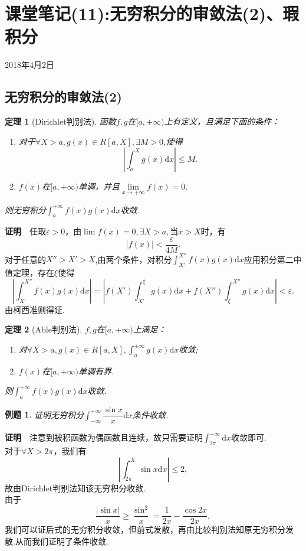 \documentclass[UTF8]{article}
\newcommand{\dx}{\mathrm{d}x}
\newcommand{\zm}{\textbf{证明}$\quad$}
\newtheorem{thm}{\hspace{2em}定理}[section]
\newtheorem{exa}{\hspace{2em}例题}[section]
\begin{document}
\section{课堂笔记(11):无穷积分的审敛法(2)、瑕积分}
\begin{center}
  2018年4月2日
\end{center}
\subsection{无穷积分的审敛法(2)}
\begin{thm}[Dirichlet判别法]
  函数$f,g$在$[a,+\infty)$上有定义，且满足下面的条件：
  \begin{enumerate}
    \item 对于$\forall X>a,g(x)\in R[a,X],\exists M>0$,使得
    $$\left|\int_a^Xg(x)\dx\right|\le M.$$
    \item $f(x)$在$[a,+\infty)$单调，并且$\lim\limits_{x\to+\infty}f(x)=0$.
  \end{enumerate}
  则无穷积分$\int_a^{+\infty}f(x)g(x)\dx$收敛.
\end{thm}
\zm 任取$\varepsilon>0$，由$\lim f(x)=0,\exists X>a,$当$x>X$时，有
$$|f(x)|<\frac{\varepsilon}{4M}.$$
对于任意的$X''>X'>X$,由两个条件，对积分$\int_{X'}^{X''}f(x)g(x)\dx$应用积分第二中值定理，存在$\xi$使得
$$\left|\int_{X'}^{X''}f(x)g(x)\dx\right|=\left|f(X')\int_{X'}^\xi g(x)\dx+f(X'')\int_\xi^{X''}g(x)\dx\right|
<\varepsilon.$$
由柯西准则得证.
\begin{thm}[Able判别法]
  $f,g$在$[a,+\infty)$上满足：
  \begin{enumerate}
    \item 对$\forall X>a,g(x)\in R[a,X],\int_a^{+\infty}g(x)\dx$收敛;
    \item $f(x)$在$[a,+\infty)$单调有界.
  \end{enumerate}
  则$\int_a^{+\infty}f(x)g(x)\dx$收敛.
\end{thm}
\begin{exa}
  证明无穷积分$\displaystyle\int_{-\infty}^{+\infty}\dfrac{\sin x}{x}\dx$条件收敛.
\end{exa}
\zm 注意到被积函数为偶函数且连续，故只需要证明$\displaystyle\int_{2\pi}^{+\infty}\dx$收敛即可.\\
对于$\forall X>2\pi，$我们有
$$\left|\int_{2\pi}^X\sin x\dx\right|\le 2,$$
故由Dirichlet判别法知该无穷积分收敛.\\
由于$$\frac{|\sin x|}{x}\ge\frac{\sin^2}{x}=\frac{1}{2x}-\frac{\cos2x}{2x},$$
我们可以证后式的无穷积分收敛，但前式发散，再由比较判别法知原无穷积分发散.从而我们证明了条件收敛.
\end{document}
